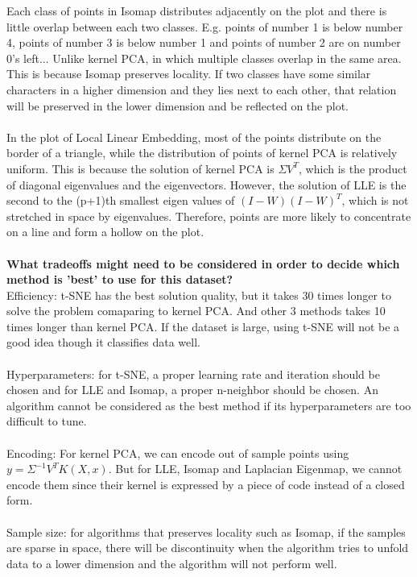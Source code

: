 \documentclass[12pt]{article}
\begin{document}
Each class of points in Isomap distributes adjacently on the plot and there is little overlap between each two classes. E.g. points of number 1 is below number 4, points of number 3 is below number 1 and points of number 2 are on number 0's left... Unlike kernel PCA, in which multiple classes overlap in the same area. This is because Isomap preserves locality. If two classes have some similar characters in a higher dimension and they lies next to each other, that relation will be preserved in the lower dimension and be reflected on the plot.\\\\
In the plot of Local Linear Embedding, most of the points distribute on the border of a triangle, while the distribution of points of kernel PCA is relatively uniform. This is because the solution of kernel PCA is $\Sigma V^T$, which is the product of diagonal eigenvalues and the eigenvectors. However, the solution of LLE is the second to the (p+1)th smallest eigen values of $(I-W)(I-W)^T$, which is not stretched in space by eigenvalues. Therefore, points are more likely to concentrate on a line and form a hollow on the plot.\\\\
\textbf{What tradeoffs might need to be considered in order to decide which method is ’best’ to use for this dataset?}\\
Efficiency: t-SNE has the best solution quality, but it takes 30 times longer to solve the problem comaparing to kernel PCA. And other 3 methods takes 10 times longer than kernel PCA. If the dataset is large, using t-SNE will not be a good idea though it classifies data well.\\\\
Hyperparameters: for t-SNE, a proper learning rate and iteration should be chosen and for LLE and Isomap, a proper n-neighbor should be chosen. An algorithm cannot be considered as the best method if its hyperparameters are too difficult to tune.\\\\
Encoding: For kernel PCA, we can encode out of sample points using $y=\Sigma^{-1}V^TK(X,x)$. But for LLE, Isomap and Laplacian Eigenmap, we cannot encode them since their kernel is expressed by a piece of code instead of a closed form.\\\\
Sample size: for algorithms that preserves locality such as Isomap, if the samples are sparse in space, there will be discontinuity when the algorithm tries to unfold data to a lower dimension and the algorithm will not perform well.
\end{document}
